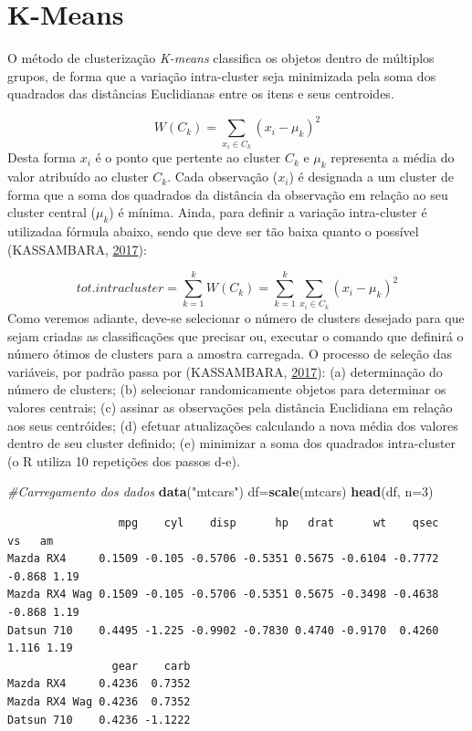 \documentclass[12pt,brazil,oneside]{book}
\newenvironment{Shaded}{\begin{snugshade}}{\end{snugshade}}
\newcommand{\CommentTok}[1]{\textcolor[rgb]{0.56,0.35,0.01}{\textit{#1}}}
\newcommand{\DataTypeTok}[1]{\textcolor[rgb]{0.13,0.29,0.53}{#1}}
\newcommand{\DecValTok}[1]{\textcolor[rgb]{0.00,0.00,0.81}{#1}}
\newcommand{\KeywordTok}[1]{\textcolor[rgb]{0.13,0.29,0.53}{\textbf{#1}}}
\newcommand{\NormalTok}[1]{#1}
\newcommand{\StringTok}[1]{\textcolor[rgb]{0.31,0.60,0.02}{#1}}
\begin{document}
\hypertarget{k-means}{%
\section{K-Means}\label{k-means}}

O método de clusterização \emph{K-means} classifica os objetos dentro de múltiplos grupos, de forma que a variação intra-cluster seja minimizada pela soma dos quadrados das distâncias Euclidianas entre os itens e seus centroides.

\[
W(C_k)=\sum _{x_i\in C_k}(x_i-\mu _k)^2
\]
Desta forma \(x_i\) é o ponto que pertente ao cluster \(C_k\) e \(\mu _k\) representa a média do valor atribuído ao cluster \(C_k\). Cada observação (\(x_i\)) é designada a um cluster de forma que a soma dos quadrados da distância da observação em relação ao seu cluster central (\(\mu _k\)) é mínima. Ainda, para definir a variação intra-cluster é utilizadaa fórmula abaixo, sendo que deve ser tão baixa quanto o possível (KASSAMBARA, \protect\hyperlink{ref-Kassambara2017}{2017}):

\[
tot.intracluster=\sum_{k=1}^{k} W(C_k)=\sum_{k=1}^{k}\sum _{x_i\in C_k}(x_i-\mu _k)^2
\]
Como veremos adiante, deve-se selecionar o número de clusters desejado para que sejam criadas as classificações que precisar ou, executar o comando que definirá o número ótimos de clusters para a amostra carregada. O processo de seleção das variáveis, por padrão passa por (KASSAMBARA, \protect\hyperlink{ref-Kassambara2017}{2017}): (a) determinação do número de clusters; (b) selecionar randomicamente objetos para determinar os valores centrais; (c) assinar as observações pela distância Euclidiana em relação aos seus centróides; (d) efetuar atualizações calculando a nova média dos valores dentro de seu cluster definido; (e) minimizar a soma dos quadrados intra-cluster (o R utiliza 10 repetições dos passos d-e).

\begin{Shaded}
\begin{Highlighting}[]
\CommentTok{#Carregamento dos dados}
\KeywordTok{data}\NormalTok{(}\StringTok{"mtcars"}\NormalTok{)}
\NormalTok{df=}\KeywordTok{scale}\NormalTok{(mtcars)}
\KeywordTok{head}\NormalTok{(df, }\DataTypeTok{n=}\DecValTok{3}\NormalTok{)}
\end{Highlighting}
\end{Shaded}

\begin{verbatim}
                 mpg    cyl    disp      hp   drat      wt    qsec     vs   am
Mazda RX4     0.1509 -0.105 -0.5706 -0.5351 0.5675 -0.6104 -0.7772 -0.868 1.19
Mazda RX4 Wag 0.1509 -0.105 -0.5706 -0.5351 0.5675 -0.3498 -0.4638 -0.868 1.19
Datsun 710    0.4495 -1.225 -0.9902 -0.7830 0.4740 -0.9170  0.4260  1.116 1.19
                gear    carb
Mazda RX4     0.4236  0.7352
Mazda RX4 Wag 0.4236  0.7352
Datsun 710    0.4236 -1.1222
\end{verbatim}
\end{document}
